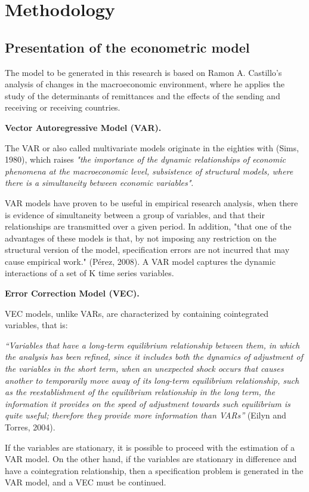 \documentclass[12pt,english, spanish]{smfart}
\begin{document}
\section{Methodology}   

\subsection{Presentation of the econometric model}

\par The model to be generated in this research is based on Ramon A. Castillo's analysis of changes in the macroeconomic environment, where he applies the study of the determinants of remittances and the effects of the sending and receiving or receiving countries.\par

\textbf{Vector Autoregressive Model (VAR).}\par
The VAR or also called multivariate models originate in the eighties with (Sims, 1980), which raises \textit{"the importance of the dynamic relationships of economic phenomena at the macroeconomic level, subsistence of structural models, where there is a simultaneity between economic variables"}.\par
VAR models have proven to be useful in empirical research analysis, when there is evidence of simultaneity between a group of variables, and that their relationships are transmitted over a given period. In addition, "that one of the advantages of these models is that, by not imposing any restriction on the structural version of the model, specification errors are not incurred that may cause empirical work." (Pérez, 2008). A VAR model captures the dynamic interactions of a set of K time series variables.\par

\textbf{Error Correction Model (VEC).}\par
VEC models, unlike VARs, are characterized by containing cointegrated variables, that is:\par
\textit{“Variables that have a long-term equilibrium relationship between them, in which the analysis has been refined, since it includes both the dynamics of adjustment of the variables in the short term, when an unexpected shock occurs that causes another to temporarily move away of its long-term equilibrium relationship, such as the reestablishment of the equilibrium relationship in the long term, the information it provides on the speed of adjustment towards such equilibrium is quite useful; therefore they provide more information than VARs”} (Eilyn and Torres, 2004).\par
If the variables are stationary, it is possible to proceed with the estimation of a VAR model. On the other hand, if the variables are stationary in difference and have a cointegration relationship, then a specification problem is generated in the VAR model, and a VEC must be continued.\par
\end{document}
